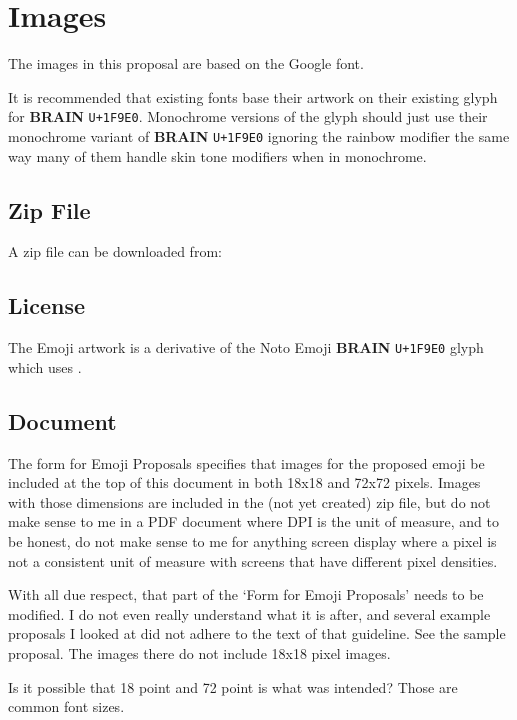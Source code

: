\section{Images}

The images in this proposal are based on the Google\textsuperscript{\textregistered}  font.

It is recommended that existing fonts base their artwork on their existing glyph for \textbf{BRAIN} \texttt{U+1F9E0}. Monochrome versions of the glyph should just use their monochrome variant of \textbf{BRAIN} \texttt{U+1F9E0} ignoring the rainbow modifier the same way many of them handle skin tone modifiers when in monochrome.

\subsection{Zip File}
A zip file can be downloaded from: 

\subsection{License}

The Emoji artwork is a derivative of the Noto Emoji \textbf{BRAIN} \texttt{U+1F9E0} glyph which uses .

\subsection{Document}

The form for Emoji Proposals specifies that images for the proposed emoji be included at the top of this document in both 18x18 and 72x72 pixels. Images with those dimensions are included in the (not yet created) zip file, but do not make sense to me in a PDF document where DPI is the unit of measure, and to be honest, do not make sense to me for anything screen display where a pixel is not a consistent unit of measure with screens that have different pixel densities.

With all due respect, that part of the `Form for Emoji Proposals' needs to be modified. I do not even really understand what it is after, and several example proposals I looked at did not adhere to the text of that guideline. See the  sample proposal. The images there do not include 18x18 pixel images.

Is it possible that 18 point and 72 point is what was intended? Those are common font sizes.
